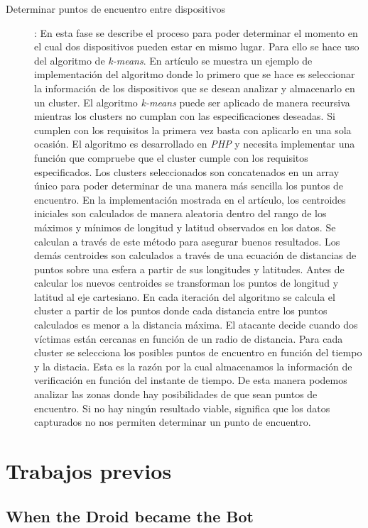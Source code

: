 \documentclass[a4paper,11pt]{report}
\begin{document}
\begin{description}
\item [Determinar puntos de encuentro entre dispositivos]: En esta fase se describe el proceso para poder determinar el momento en el cual dos dispositivos pueden estar en mismo lugar. Para ello se hace uso del algoritmo de \emph{k-means}. En artículo se muestra un ejemplo de implementación del algoritmo donde lo primero que se hace es seleccionar la información de los dispositivos que se desean analizar y almacenarlo en un cluster. El algoritmo \emph{k-means} puede ser aplicado de manera recursiva mientras los clusters no cumplan con las especificaciones deseadas. Si cumplen con los requisitos la primera vez basta con aplicarlo en una sola ocasión. El algoritmo es desarrollado en \emph{PHP} y necesita implementar una función que compruebe que el cluster cumple con los requisitos especificados. Los clusters seleccionados son concatenados en un array único para poder determinar de una manera más sencilla los puntos de encuentro. En la implementación mostrada en el artículo, los centroides iniciales son calculados de manera aleatoria dentro del rango de los máximos y mínimos de longitud y latitud observados en los datos. Se calculan a través de este método para asegurar buenos resultados. Los demás centroides son calculados a través de una ecuación de distancias de puntos sobre una esfera a partir de sus longitudes y latitudes. Antes de calcular los nuevos centroides se transforman los puntos de longitud y latitud al eje cartesiano. En cada iteración del algoritmo se calcula el cluster a partir de los puntos donde cada distancia entre los puntos calculados es menor a la distancia máxima. El atacante decide cuando dos víctimas están cercanas en función de un radio de distancia. Para cada cluster se selecciona los posibles puntos de encuentro en función del tiempo y la distacia. Esta es la razón por la cual almacenamos la información de verificación en función del instante de tiempo. De esta manera podemos analizar las zonas donde hay posibilidades de que sean puntos de encuentro. Si no hay ningún resultado viable, significa que los datos capturados no nos permiten determinar un punto de encuentro.

\end{description}



\chapter{Trabajos previos}

\section*{When the Droid became the Bot}
\end{document}
